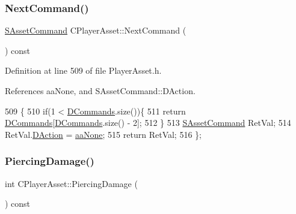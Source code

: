 \hypertarget{classCPlayerAsset_aa7723b668d4278f23eb28ca8b6043192}{}\label{classCPlayerAsset_aa7723b668d4278f23eb28ca8b6043192} 
\subsubsection{\texorpdfstring{Next\+Command()}{NextCommand()}}
{\footnotesize\ttfamily \hyperlink{structSAssetCommand}{S\+Asset\+Command} C\+Player\+Asset\+::\+Next\+Command (\begin{DoxyParamCaption}{ }\end{DoxyParamCaption}) const\hspace{0.3cm}{\ttfamily [inline]}}



Definition at line 509 of file Player\+Asset.\+h.



References aa\+None, and S\+Asset\+Command\+::\+D\+Action.


\begin{DoxyCode}
509                                          \{
510             \textcolor{keywordflow}{if}(1 < \hyperlink{classCPlayerAsset_a4d3b96106d3b1c1020f98005884d2a87}{DCommands}.size())\{
511                 \textcolor{keywordflow}{return} \hyperlink{classCPlayerAsset_a4d3b96106d3b1c1020f98005884d2a87}{DCommands}[\hyperlink{classCPlayerAsset_a4d3b96106d3b1c1020f98005884d2a87}{DCommands}.size() - 2];
512             \}
513             \hyperlink{structSAssetCommand}{SAssetCommand} RetVal;
514             RetVal.\hyperlink{structSAssetCommand_a8edd3b3d59a76d5514ba403bc8076a75}{DAction} = \hyperlink{GameDataTypes_8h_ab47668e651a3032cfb9c40ea2d60d670ac17cc5a0035320c060d7f8074143b507}{aaNone};
515             \textcolor{keywordflow}{return} RetVal;
516         \};
\end{DoxyCode}
\hypertarget{classCPlayerAsset_a1949069b1bec611fdfa74488a3d6864f}{}\label{classCPlayerAsset_a1949069b1bec611fdfa74488a3d6864f} 
\subsubsection{\texorpdfstring{Piercing\+Damage()}{PiercingDamage()}}
{\footnotesize\ttfamily int C\+Player\+Asset\+::\+Piercing\+Damage (\begin{DoxyParamCaption}{ }\end{DoxyParamCaption}) const\hspace{0.3cm}{\ttfamily [inline]}}



